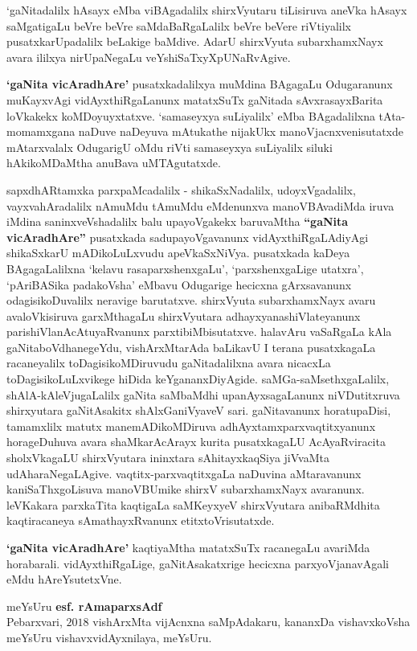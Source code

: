 \bigskip

`gaNitadalilx hAsayx eMba viBAgadalilx shirxVyutaru tiLisiruva aneVka hAsayx saMgatigaLu beVre beVre saMdaBaRgaLalilx beVre beVere riVtiyalilx pusatxkarUpadalilx beLakige baMdive. AdarU shirxVyuta subarxhamxNayx avara ililxya nirUpaNegaLu veYshiSaTxyXpUNaRvAgive.

\bigskip

{\bf `gaNita vicAradhAre'} pusatxkadalilxya muMdina BAgagaLu Odugaranunx muKayxvAgi vidAyxthiRgaLanunx matatxSuTx gaNitada sAvxrasayxBarita loVkakekx koMDoyuyxtatxve. `samaseyxya suLiyalilx' eMba BAgadalilxna tAta-momamxgana naDuve naDeyuva mAtukathe nijakUkx manoVjacnxvenisutatxde mAtarxvalalx OdugarigU oMdu riVti samaseyxya suLiyalilx siluki hAkikoMDaMtha anuBava uMTAgutatxde.

\bigskip

sapxdhARtamxka parxpaMcadalilx - shikaSxNadalilx, udoyxVgadalilx, vayxvahAradalilx nAmuMdu tAmuMdu eMdenunxva manoVBAvadiMda iruva iMdina saninxveVshadalilx balu upayoVgakekx baruvaMtha {\bf ``gaNita vicAradhAre''} pusatxkada sadupayoVgavanunx vidAyxthiRgaLAdiyAgi shikaSxkarU mADikoLuLxvudu apeVkaSxNiVya. pusatxkada kaDeya BAgagaLalilxna `kelavu rasaparxshenxgaLu', `parxshenxgaLige utatxra', `pAriBASika padakoVsha' eMbavu Odugarige hecicxna gArxsavanunx odagisikoDuvalilx neravige barutatxve. shirxVyuta subarxhamxNayx avaru avaloVkisiruva garxMthagaLu shirxVyutara adhayxyanashiVlateyanunx parishiVlanAcAtuyaRvanunx parxtibiMbisutatxve. halavAru vaSaRgaLa kAla gaNitaboVdhanegeYdu, vishArxMtarAda baLikavU I terana pusatxkagaLa racaneyalilx toDagisikoMDiruvudu gaNitadalilxna avara nicacxLa toDagisikoLuLxvikege hiDida keYgananxDiyAgide. saMGa-saMsethxgaLalilx, shAlA-kAleVjugaLalilx gaNita saMbaMdhi upanAyxsagaLanunx niVDutitxruva shirxyutara gaNitAsakitx shAlxGaniVyaveV sari. gaNitavanunx horatupaDisi, tamamxlilx matutx manemADikoMDiruva adhAyxtamxparxvaqtitxyanunx horageDuhuva avara shaMkarAcArayx kurita pusatxkagaLU AcAyaRviracita sholxVkagaLU shirxVyutara ininxtara sAhitayxkaqSiya jiVvaMta udAharaNegaLAgive. vaqtitx-parxvaqtitxgaLa naDuvina aMtaravanunx kaniSaThxgoLisuva manoVBUmike shirxV subarxhamxNayx avaranunx. leVKakara parxkaTita kaqtigaLa saMKeyxyeV shirxVyutara anibaRMdhita kaqtiracaneya sAmathayxRvanunx etitxtoVrisutatxde.

\bigskip

{\bf `gaNita vicAradhAre'} kaqtiyaMtha matatxSuTx racanegaLu avariMda horabarali. vidAyxthiRgaLige, gaNitAsakatxrige hecicxna parxyoVjanavAgali eMdu hAreYsutetxVne.

\bigskip

\begin{flushright}
meYsUru \hfill{\bf esf. rAmaparxsAdf}\hfill\\
Pebarxvari, $2018$ \hfill{vishArxMta vijAcnxna saMpAdakaru, kananxDa vishavxkoVsha}\\
\hfill{meYsUru vishavxvidAyxnilaya, meYsUru.}
\end{flushright}
